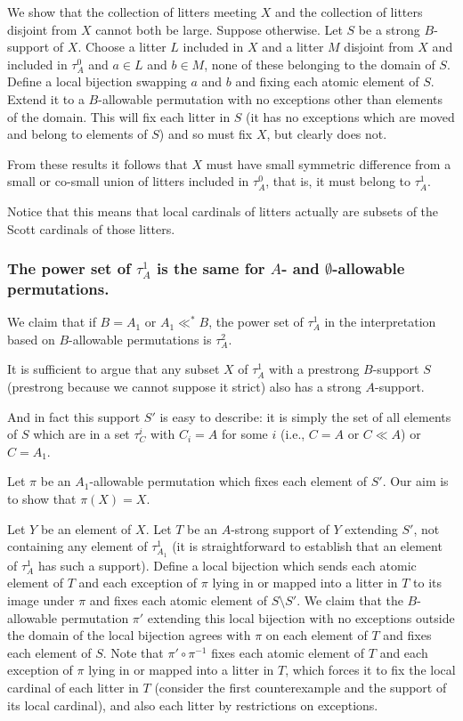 \documentclass[12pt]{article}
\begin{document}
We show that the collection of litters meeting $X$ and the collection of litters disjoint from $X$ cannot both be large.  Suppose otherwise.  Let $S$ be a strong $B$-support of $X$.
Choose a litter $L$ included in $X$ and a litter $M$ disjoint from $X$ and included in $\tau^0_A$  and $a \in L$ and $b \in M$, none of these belonging to the domain of $S$.  Define a local bijection swapping $a$ and $b$ and fixing each atomic element of $S$.  Extend it to a $B$-allowable permutation with no exceptions other than elements of the domain.  This will fix
each litter in $S$ (it has no exceptions which are moved and belong to elements of $S$) and so must fix $X$, but clearly does not.

From these results it follows that $X$ must have small symmetric difference from a small or co-small union of litters included in $\tau^0_A$, that is, it must belong to $\tau^1_A$.

Notice that this means that local cardinals of litters actually are subsets of the Scott cardinals of those litters.

\newpage

\subsubsection{The power set of $\tau^1_A$ is the same for $A$- and $\emptyset$-allowable permutations.}

We claim that if $B=A_1$ or $A_1 \ll^* B$, the power set of  $\tau^1_A$ in
the interpretation based on $B$-allowable permutations is $\tau^2_A$.

It is sufficient to argue that any subset $X$ of $\tau^1_A$ with a prestrong $B$-support $S$ (prestrong because we cannot suppose it strict) also has a strong $A$-support.

And in fact this support $S'$ is easy to describe:  it is simply the set of all elements of $S$ which are in a set $\tau^i_C$ with $C_i = A$ for some $i$ (i.e., $C=A$ or $C \ll A$) or $C=A_1$.

Let $\pi$ be an $A_1$-allowable permutation which fixes each element of $S'$.  Our aim is to show that $\pi(X)=X$.

Let $Y$ be an element of $X$.  Let $T$ be an $A$-strong support of $Y$ extending $S'$, not containing any element of $\tau^1_{A_1}$ (it is straightforward to establish that
an element of $\tau^1_A$ has such a support).  Define a local bijection which sends each atomic element of $T$ and each exception of $\pi$ lying in or mapped into a litter in $T$ to its image under $\pi$
and fixes each atomic element of $S \setminus S'$.  We claim that the $B$-allowable permutation $\pi'$ extending this local bijection with no exceptions outside the domain of the local bijection  agrees with $\pi$ on each element of $T$ and fixes each element of $S$.  Note that $\pi' \circ \pi^{-1}$ fixes each atomic element of $T$ and each exception of $\pi$ lying in or mapped into a litter in $T$, which forces it to fix the local cardinal of each litter in $T$ (consider the first counterexample and the support of its local cardinal), and also each litter by restrictions on exceptions. 
\end{document}

